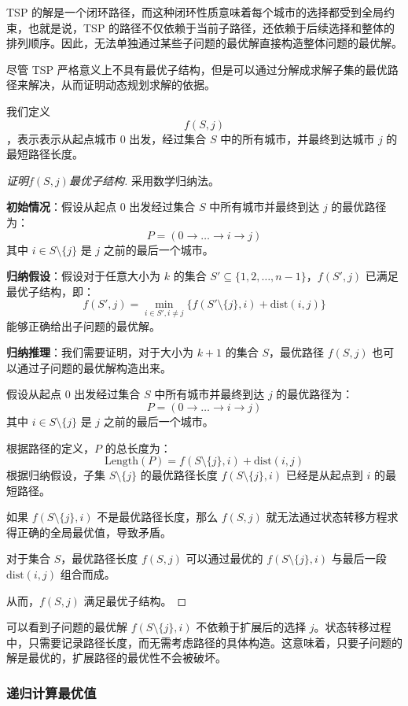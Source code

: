 TSP 的解是一个闭环路径，而这种闭环性质意味着每个城市的选择都受到全局约束，也就是说，TSP 的路径不仅依赖于当前子路径，还依赖于后续选择和整体的排列顺序。因此，无法单独通过某些子问题的最优解直接构造整体问题的最优解。

尽管 TSP 严格意义上不具有最优子结构，但是可以通过分解成求解子集的最优路径来解决，从而证明动态规划求解的依据。

我们定义 \[f(S,j)\]，表示表示从起点城市 $0$ 出发，经过集合 $S$ 中的所有城市，并最终到达城市 $j$ 的最短路径长度。
\begin{proof}[证明$f(S,j)$最优子结构]
    采用数学归纳法。

    \textbf{初始情况}：假设从起点 $0$ 出发经过集合 $S$ 中所有城市并最终到达 $j$ 的最优路径为：
\[
P = (0 \to \dots \to i \to j)
\]
其中 $i \in S \setminus \{j\}$ 是 $j$ 之前的最后一个城市。

\textbf{归纳假设}：假设对于任意大小为 $k$ 的集合 $S' \subseteq \{1, 2, \dots, n-1\}$，$f(S', j)$ 已满足最优子结构，即：  
\[
f(S', j) = \min_{i \in S', i \neq j} \{ f(S' \setminus \{j\}, i) + \text{dist}(i, j) \}
\]
能够正确给出子问题的最优解。

\textbf{归纳推理}：我们需要证明，对于大小为 $k+1$ 的集合 $S$，最优路径 $f(S, j)$ 也可以通过子问题的最优解构造出来。

假设从起点 $0$ 出发经过集合 $S$ 中所有城市并最终到达 $j$ 的最优路径为：
\[
P = (0 \to \dots \to i \to j)
\]
其中 $i \in S \setminus \{j\}$ 是 $j$ 之前的最后一个城市。

根据路径的定义，$P$ 的总长度为：
\[
\text{Length}(P) = f(S \setminus \{j\}, i) + \text{dist}(i, j)
\]
根据归纳假设，子集 $S \setminus \{j\}$ 的最优路径长度 $f(S \setminus \{j\}, i)$ 已经是从起点到 $i$ 的最短路径。

如果 $f(S \setminus \{j\}, i)$ 不是最优路径长度，那么 $f(S, j)$ 就无法通过状态转移方程求得正确的全局最优值，导致矛盾。

对于集合 $S$，最优路径长度 $f(S, j)$ 可以通过最优的 $f(S \setminus \{j\}, i)$ 与最后一段 $\text{dist}(i, j)$ 组合而成。

从而，$f(S, j)$ 满足最优子结构。
\end{proof}

可以看到子问题的最优解 $f(S \setminus \{j\}, i)$ 不依赖于扩展后的选择 $j$。状态转移过程中，只需要记录路径长度，而无需考虑路径的具体构造。这意味着，只要子问题的解是最优的，扩展路径的最优性不会被破坏。

\subsubsection{递归计算最优值}


